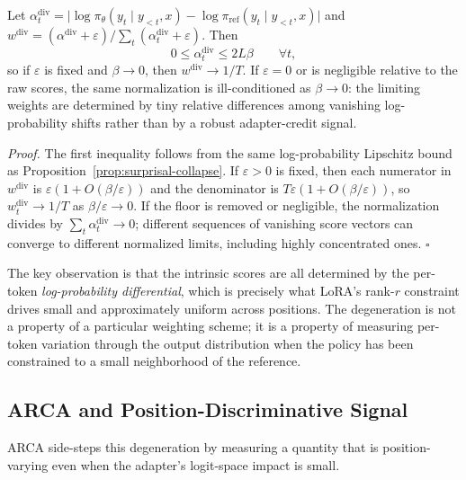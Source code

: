 \begin{proposition}
\label{prop:divergence-collapse}
Let $\alpha_t^{\mathrm{div}} = \lvert \log \pi_\theta(y_t \mid y_{<t}, x)
- \log \pi_{\mathrm{ref}}(y_t \mid y_{<t}, x) \rvert$ and
$w^{\mathrm{div}} = (\alpha^{\mathrm{div}}+\varepsilon) /
\sum_t (\alpha_t^{\mathrm{div}}+\varepsilon)$.
Then
\[
0 \le \alpha_t^{\mathrm{div}} \le 2 L \beta \qquad \forall t,
\]
so if $\varepsilon$ is fixed and $\beta \to 0$, then
$w^{\mathrm{div}} \to 1/T$. If $\varepsilon=0$ or is negligible relative to
the raw scores, the same normalization is ill-conditioned as $\beta \to 0$:
the limiting weights are determined by tiny relative differences among
vanishing log-probability shifts rather than by a robust adapter-credit
signal.
\end{proposition}

\noindent\emph{Proof.}
The first inequality follows from the same log-probability Lipschitz bound as
Proposition~\ref{prop:surprisal-collapse}. If $\varepsilon>0$ is fixed, then
each numerator in $w^{\mathrm{div}}$ is
$\varepsilon(1+O(\beta/\varepsilon))$ and the denominator is
$T\varepsilon(1+O(\beta/\varepsilon))$, so
$w_t^{\mathrm{div}}\to 1/T$ as $\beta/\varepsilon\to0$. If the floor is
removed or negligible, the normalization divides by $\sum_t
\alpha_t^{\mathrm{div}}\to0$; different sequences of vanishing score vectors
can converge to different normalized limits, including highly concentrated
ones. \hfill$\square$

The key observation is that the intrinsic scores are all determined by the
per-token \emph{log-probability differential}, which is precisely what LoRA's
rank-$r$ constraint drives small and approximately uniform across positions.
The degeneration is not a property of a particular weighting scheme; it is a
property of measuring per-token variation through the output distribution
when the policy has been constrained to a small neighborhood of the
reference.

\subsection{ARCA and Position-Discriminative Signal}\label{sec:theory-arca}

ARCA side-steps this degeneration by measuring a quantity that is position-varying
even when the adapter's logit-space impact is small.


